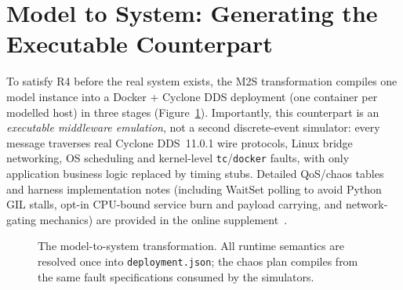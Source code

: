 \section{Model to System: Generating the Executable Counterpart}
\label{sec:m2s}

To satisfy R4 before the real system exists, the M2S transformation compiles one model instance into a Docker + Cyclone DDS deployment (one container per modelled host) in three stages (Figure~\ref{fig:m2s}). Importantly, this counterpart is an \emph{executable middleware emulation}, not a second discrete-event simulator: every message traverses real Cyclone DDS~11.0.1 wire protocols, Linux bridge networking, OS scheduling and kernel-level \texttt{tc}/\texttt{docker} faults, with only application business logic replaced by timing stubs. Detailed QoS/chaos tables and harness implementation notes (including WaitSet polling to avoid Python GIL stalls, opt-in CPU-bound service burn and payload carrying, and network-gating mechanics) are provided in the online supplement~\citep{sag-software}.

\begin{figure}[t]
\centering
{}
\caption{The model-to-system transformation. All runtime semantics are resolved once into \texttt{deployment.json}; the chaos plan compiles from the same fault specifications consumed by the simulators.}
\label{fig:m2s}
\end{figure}

